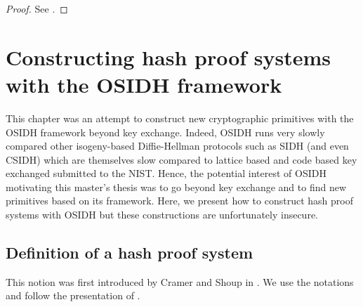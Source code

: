 \documentclass[a4paper,10pt,notitlepage]{report}
\theoremstyle{definition}
\theoremstyle{plain}
\theoremstyle{definition}
\renewcommand{\(}{\left(}
\renewcommand{\)}{\right)}
\begin{document}
\begin{proof}
See \cite[Theorem 7.1]{Kuperberg}.
\end{proof}

\chapter{Constructing hash proof systems with the OSIDH framework}\label{Appendix C}

This chapter was an attempt to construct new cryptographic primitives with the OSIDH framework beyond key exchange. Indeed, OSIDH runs very slowly compared other isogeny-based Diffie-Hellman protocols such as SIDH (and even CSIDH) which are themselves slow compared to lattice based and code based key exchanged submitted to the NIST. Hence, the potential interest of OSIDH motivating this master's thesis was to go beyond key exchange and to find new primitives based on its framework. Here, we present how to construct hash proof systems with OSIDH but these constructions are unfortunately insecure.

\section{Definition of a hash proof system}

This notion was first introduced by Cramer and Shoup in \cite{Cramer_Shoup}. We use the notations and follow the presentation of \cite{DeFeo1}.
\end{document}

